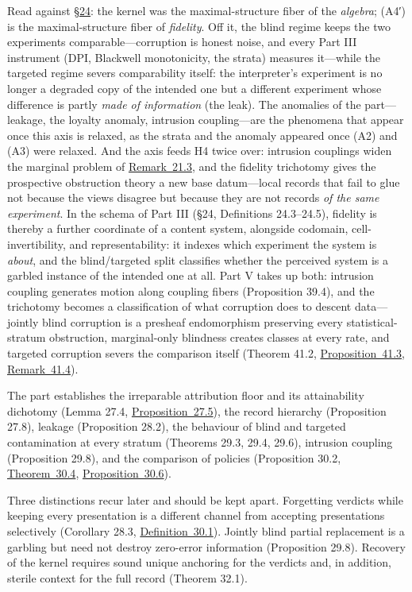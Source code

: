 Read against \hyperlink{sec:24}{§24}: the kernel was the maximal-structure fiber of the \emph{algebra}; (A4′) is the maximal-structure fiber of \emph{fidelity}. Off it, the blind regime keeps the two experiments comparable---\hspace{0pt}corruption is honest noise, and every Part III instrument (DPI, Blackwell monotonicity, the strata) measures it---\hspace{0pt}while the targeted regime severs comparability itself: the interpreter's experiment is no longer a degraded copy of the intended one but a different experiment whose difference is partly \emph{made of information} (the leak). The anomalies of the part---\hspace{0pt}leakage, the loyalty anomaly, intrusion coupling---\hspace{0pt}are the phenomena that appear once this axis is relaxed, as the strata and the anomaly appeared once (A2) and (A3) were relaxed. And the axis feeds H4 twice over: intrusion couplings widen the marginal problem of \hyperlink{stmt:21.3}{Remark~21.3}, and the fidelity trichotomy gives the prospective obstruction theory a new base datum---\hspace{0pt}local records that fail to glue not because the views disagree but because they are not records \emph{of the same experiment}. In the schema of Part III (§24, Definitions 24.3--24.5), fidelity is thereby a further coordinate of a content system, alongside codomain, cell-invertibility, and representability: it indexes which experiment the system is \emph{about}, and the blind/targeted split classifies whether the perceived system is a garbled instance of the intended one at all. Part V takes up both: intrusion coupling generates motion along coupling fibers (Proposition 39.4), and the trichotomy becomes a classification of what corruption does to descent data---\hspace{0pt}jointly blind corruption is a presheaf endomorphism preserving every statistical-stratum obstruction, marginal-only blindness creates classes at every rate, and targeted corruption severs the comparison itself (Theorem 41.2, \hyperlink{stmt:41.3}{Proposition~41.3}, \hyperlink{stmt:41.4}{Remark~41.4}).


The part establishes the irreparable attribution floor and its attainability dichotomy (Lemma 27.4, \hyperlink{stmt:27.5}{Proposition~27.5}), the record hierarchy (Proposition 27.8), leakage (Proposition 28.2), the behaviour of blind and targeted contamination at every stratum (Theorems 29.3, 29.4, 29.6), intrusion coupling (Proposition 29.8), and the comparison of policies (Proposition 30.2, \hyperlink{stmt:30.4}{Theorem~30.4}, \hyperlink{stmt:30.6}{Proposition~30.6}).

Three distinctions recur later and should be kept apart. Forgetting verdicts while keeping every presentation is a different channel from accepting presentations selectively (Corollary 28.3, \hyperlink{stmt:30.1}{Definition~30.1}). Jointly blind partial replacement is a garbling but need not destroy zero-error information (Proposition 29.8). Recovery of the kernel requires sound unique anchoring for the verdicts and, in addition, sterile context for the full record (Theorem 32.1).
